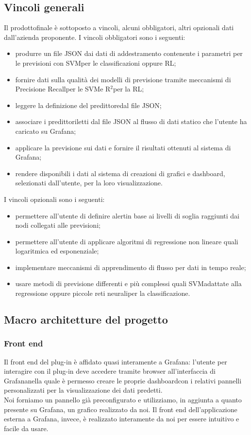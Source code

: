 	\subsection{Vincoli generali}
	Il prodotto\glosp finale è sottoposto a vincoli, alcuni obbligatori, altri opzionali dati dall'azienda proponente.
	I vincoli obbligatori sono i seguenti:
	\begin{itemize}
		\item produrre un file JSON dai dati di addestramento contenente i parametri per le previsioni con SVM\glosp per le classificazioni oppure RL\glo;
		\item fornire dati sulla qualità dei modelli di previsione tramite meccanismi di Precision\glosp e Recall\glosp per le SVM\glosp e R$^{2}$\glosp per la RL\glo;
		\item leggere la definizione del predittore\glosp dal file JSON;
		\item associare i predittori\glosp letti dal file JSON al flusso di dati statico che l'utente ha caricato su Grafana\glo;
		\item applicare la previsione sui dati e fornire il risultati ottenuti al sistema di Grafana\glo;
		\item rendere disponibili i dati al sistema di creazioni di grafici e dashboard\glo, selezionati dall'utente, per la loro visualizzazione.
	\end{itemize}
	I vincoli opzionali sono i seguenti:
	\begin{itemize}
		\item permettere all'utente di definire alert\glosp in base ai livelli di soglia raggiunti dai nodi collegati alle previsioni;
		\item permettere all'utente di applicare algoritmi di regressione non lineare quali logaritmica ed esponenziale;
		\item implementare meccanismi di apprendimento di flusso per dati in tempo reale;
		\item usare metodi di previsione differenti e più complessi quali SVM\glosp adattate alla regressione oppure piccole reti neurali\glosp per la classificazione.
	\end{itemize}
	\subsection{Macro architetture del progetto}
		\subsubsection{Front end}
		Il front end del plug-in è affidato quasi interamente a Grafana\glo: l'utente per interagire con il plug-in deve accedere tramite browser all'interfaccia di Grafana\glosp nella quale è permesso creare le proprie dashboard\glosp con i relativi pannelli personalizzati per la visualizzazione dei dati predetti. \\
		Noi forniamo un pannello già preconfigurato e utilizziamo, in aggiunta a quanto presente su Grafana\glo, un grafico realizzato da noi.
		Il front end dell'applicazione esterna a Grafana, invece, è realizzato interamente da noi per essere intuitivo e facile da usare.
